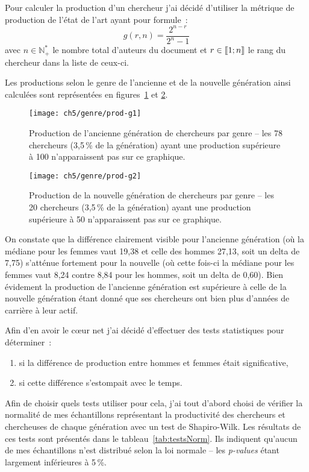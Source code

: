			Pour calculer la production d'un chercheur j'ai décidé d'utiliser la métrique de production de l'état de l'art \citep*{geometric} ayant pour formule~:
		\[g(r,n) = \frac{2^{n-r}}{2^n-1}\]
		avec $n \in \mathbb{N}^*_+$ le nombre total d'auteurs du document et $r \in [\mspace{-2.5 mu}[1;n]\mspace{-2.5 mu}]$ le rang du chercheur dans la liste de ceux-ci.
			
			Les productions selon le genre de l'ancienne et de la nouvelle génération ainsi calculées sont représentées en figures~\ref{fig:prod-g1} et \ref{fig:prod-g2}.
			
			\begin{figure}[p]
				\centering
				\texttt{[image: ch5/genre/prod-g1]}
				\caption{Production de l'ancienne génération de chercheurs par genre -- les
78 chercheurs (3,5\,\% de la génération) ayant une production supérieure à 100 n’apparaissent pas sur ce graphique.}\label{fig:prod-g1}
			\end{figure}
			
			\begin{figure}[p]
				\centering
				\texttt{[image: ch5/genre/prod-g2]}
				\caption{Production de la nouvelle génération de chercheurs par genre -- les
20 chercheurs (3,5\,\% de la génération) ayant une production supérieure à 50 n’apparaissent pas sur ce graphique.}\label{fig:prod-g2}
			\end{figure}
			
			On constate que la différence clairement visible pour l'ancienne génération (où la médiane pour les femmes vaut 19,38 et celle des hommes 27,13, soit un delta de 7,75) s'atténue fortement pour la nouvelle (où cette fois-ci la médiane pour les femmes vaut 8,24 contre 8,84 pour les hommes, soit un delta de 0,60). Bien évidement la production de l'ancienne génération est supérieure à celle de la nouvelle génération étant donné que ses chercheurs ont bien plus d'années de carrière à leur actif.
			
			Afin d'en avoir le c\oe ur net j'ai décidé d'effectuer des tests statistiques pour déterminer~:
			\begin{enumerate}
				\item si la différence de production entre hommes et femmes était significative,
				\item si cette différence s'estompait avec le temps.
			\end{enumerate}
			
			Afin de choisir quels tests utiliser pour cela, j'ai tout d'abord choisi de vérifier la normalité de mes échantillons représentant la productivité des chercheurs et chercheuses de chaque génération avec un test de Shapiro-Wilk. Les résultats de ces tests sont présentés dans le tableau~\ref{tab:testsNorm}. Ils indiquent qu'aucun de mes échantillons n'est distribué selon la loi normale -- les \textit{p-values} étant largement inférieures à 5\,\%.
			
